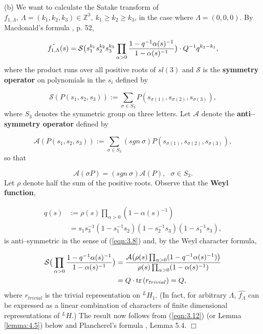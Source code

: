 \documentclass[12pt,letterpaper]{amsart}
\numberwithin{equation}{section}
\theoremstyle{definition}
\theoremstyle{plain}
\providecommand{\cal}{\mathcal}
\def\sss{{\cal S}}
\def\zzz{\mathbb{Z}}
\def\qed{$\Box$}
\begin{document}
(b) We want to calculate the Satake transform of ${f_{1,\Lambda}},
\ \Lambda =(k_1,k_2,k_3)\in\zzz^3, \ k_1\geq k_2\geq k_3$, in the
case where $\Lambda =(0,0,0)$. By Macdonald's formula 
\cite{Ma71}, p. 52,

\begin{equation}
\label{eqn:3.5}
\hat{f_{1,\Lambda}}(s)
=\sss \big(s_1^{k_1}s_2^{k_2}s_3^{k_3}\prod_{\alpha >0}
{1-q^{-1}\alpha (s)^{-1}\over{1-\alpha (s)^{-1}}}\big)
\cdot Q^{-1}q^{k_3-k_1},
\end{equation}
where the product runs over all positive roots of $sl(3)$ and
$\sss$ is the {\bf symmetry operator} on polynomials in the 
$s_i$ defined by

\begin{equation}
\label{eqn:3.6}
\sss (P(s_1,s_2,s_3)) := \sum_{\sigma\in S_3}
P(s_{\sigma (1)},s_{\sigma (2)},s_{\sigma (3)}),
\end{equation}
where $S_3$ denotes the symmetric group on three letters. Let
${\cal A}$ denote the {\bf anti--symmetry operator} defined by

\begin{equation}
\label{eqn:3.7}
{\cal A} (P(s_1,s_2,s_3)) := \sum_{\sigma\in S_3}
(sgn\  \sigma )P(s_{\sigma (1)},s_{\sigma (2)},s_{\sigma (3)}),
\end{equation}
so that

\begin{equation}
\label{eqn:3.8}
{\cal A} (\sigma P) = (sgn\ \sigma ){\cal A} (P),\ \ \ \sigma\in S_3.
\end{equation}
Let $\rho$ denote half the sum of the positive roots.
Observe that the {\bf Weyl function},

\begin{equation}
\label{eqn:3.9}
\begin{split}
q(s)
&:=\rho (s)\prod_{\alpha >0}(1-\alpha (s)^{-1})\\
&=s_1s_3^{-1}(1-s_1^{-1}s_2)(1-s_2^{-1}s_3)(1-s_1^{-1}s_3),
\end{split}
\end{equation}
is anti--symmetric in the sense of (\ref{eqn:3.8}) and, by the Weyl character
formula,

\begin{equation}
\label{eqn:3.10}
\begin{split}
\sss \big(\prod_{\alpha >0}
{1-q^{-1}\alpha (s)^{-1}\over{1-\alpha (s)^{-1}}}\big)
&={{{\cal A} \big(\rho (s)\prod_{\alpha >0}(1-q^{-1}\alpha (s)^{-1})\big)}
\over{\rho (s)\prod_{\alpha >0}(1-\alpha (s)^{-1})}}\\
&=Q\cdot {\rm tr}\, (r_{trivial}) = Q,
\end{split}
\end{equation}
where $r_{trivial}$ is the trivial representation on $^{L}H_1$.
(In fact, for arbitrary $\Lambda$, $\hat{f_{\Lambda}}$ can be expressed
as a linear combination of characters of finite dimensional representations 
of $^{L}H$.) The result now
follows from (\ref{eqn:3.12}) (or Lemma \ref{lemma:4.5}) below and
Plancherel's formula \cite{La80b}, Lemma 5.4.
\qed
\end{document}

